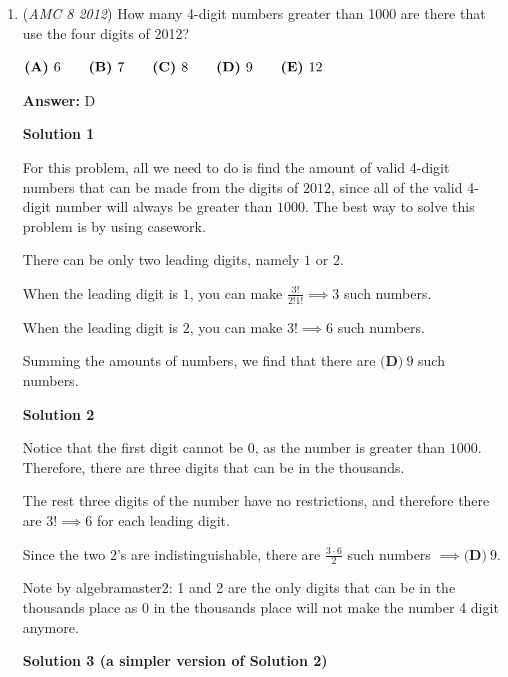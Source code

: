 \begin{enumerate}
 


	\item (\textit{AMC 8 2012}) How many 4-digit numbers greater than 1000 are there that use the four digits of 2012?


 $\textbf{(A)}\hspace{.05in}6\qquad\textbf{(B)}\hspace{.05in}7\qquad\textbf{(C)}\hspace{.05in}8\qquad\textbf{(D)}\hspace{.05in}9\qquad\textbf{(E)}\hspace{.05in}12$

 \textbf{Answer: }D



\textbf{Solution 1}

For this problem, all we need to do is find the amount of valid 4-digit numbers that can be made from the digits of $2012$, since all of the valid 4-digit number will always be greater than $1000$. The best way to solve this problem is by using casework.

 There can be only two leading digits, namely $1$ or $2$.

 When the leading digit is $1$, you can make $\frac{3!}{2!1!} \implies 3$ such numbers. 

 When the leading digit is $2$, you can make $3! \implies 6$ such numbers.

 Summing the amounts of numbers, we find that there are $\boxed{\textbf{(D)}\ 9}$ such numbers.

 



\textbf{Solution 2}

Notice that the first digit cannot be $0$, as the number is greater than $1000$. Therefore, there are three digits that can be in the thousands. 

 The rest three digits of the number have no restrictions, and therefore there are $3! \implies 6$ for each leading digit.

 Since the two $2$'s are indistinguishable, there are $\frac {3\cdot6}{2}$ such numbers $\implies \boxed{\textbf{(D)}\ 9}$.

 Note by algebramaster2: 1 and 2 are the only digits that can be in the thousands place as 0 in the thousands place will not make the number 4 digit anymore.

 



\textbf{Solution 3 (a simpler version of Solution 2)}


\end{enumerate}
